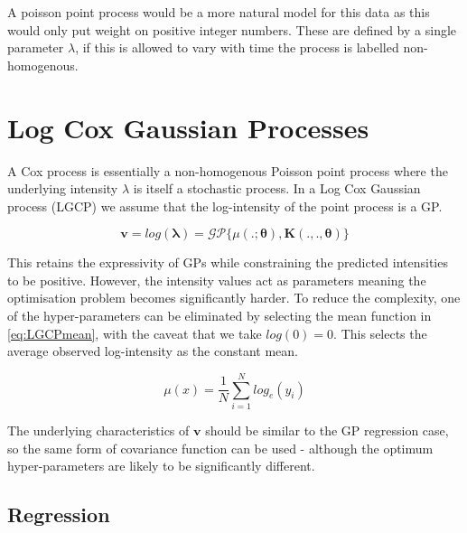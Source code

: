 \documentclass[a4paper,11pt]{report}
\begin{document}

A poisson point process would be a more natural model for this data as this would only put weight on positive integer numbers. These are defined by a single parameter \(\lambda\), if this is allowed to vary with time the process is labelled non-homogenous. 


\chapter{Log Cox Gaussian Processes}


A Cox process is essentially a non-homogenous Poisson point process where the underlying intensity \(\lambda\) is itself a stochastic process. In a Log Cox Gaussian process (LGCP) we assume that the log-intensity of the point process is a GP. 

\begin{equation} \label{eq:LGCPsetup}
\mathbf{v} = log(\boldsymbol{\lambda}) = \mathcal{G}\mathcal{P} \{ \mu(. ;\boldsymbol{\theta}) , \mathbf{K}(. , . ,\boldsymbol{\theta})\}
\end{equation}

This retains the expressivity of GPs while constraining the predicted intensities to be positive. However, the intensity values act as parameters meaning the optimisation problem becomes significantly harder. To reduce the complexity, one of the hyper-parameters can be eliminated by selecting the mean function in \ref{eq:LGCPmean}, with the caveat that we take \(log(0)=0\). This selects the average observed log-intensity as the constant mean. 

\begin{equation} \label{eq:LGCPmean}
\mu (x) = \frac{1}{N} \sum_{i=1}^{N} log_e(y_i)
\end{equation}

The underlying characteristics of \(\mathbf{v}\) should be similar to the GP regression case, so the same form of covariance function can be used - although the optimum hyper-parameters are likely to be significantly different.

\section{Regression}
\end{document}
